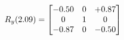 \documentclass[preview]{standalone}
\begin{document}
\begin{align*}
\special{dvisvgm:raw <g id='unique000'>}R_{y}(2.09) = \begin{bmatrix}-0.50 & 0 & +0.87 \\0 & 1 & 0 \\-0.87 & 0 & -0.50\end{bmatrix}\special{dvisvgm:raw </g>}
\end{align*}
\end{document}
